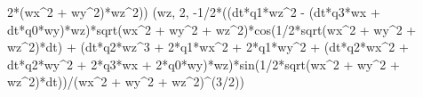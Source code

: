 \documentclass[]{article}
\newenvironment{Shaded}{}{}
\newcommand{\DecValTok}[1]{\textcolor[rgb]{0.25,0.63,0.44}{#1}}
\newcommand{\OperatorTok}[1]{\textcolor[rgb]{0.40,0.40,0.40}{#1}}
\newcommand{\NormalTok}[1]{#1}
\begin{document}
\begin{Shaded}
\begin{Highlighting}[]
\DecValTok{2}\OperatorTok{*}\NormalTok{(wx}\OperatorTok{^}\DecValTok{2} \OperatorTok{+}\NormalTok{ wy}\OperatorTok{^}\DecValTok{2}\NormalTok{)}\OperatorTok{*}\NormalTok{wz}\OperatorTok{^}\DecValTok{2}\NormalTok{))}
\NormalTok{(wz, }\DecValTok{2}\NormalTok{, }\OperatorTok{-}\DecValTok{1}\OperatorTok{/}\DecValTok{2}\OperatorTok{*}\NormalTok{((dt}\OperatorTok{*}\NormalTok{q1}\OperatorTok{*}\NormalTok{wz}\OperatorTok{^}\DecValTok{2} \OperatorTok{-}\NormalTok{ (dt}\OperatorTok{*}\NormalTok{q3}\OperatorTok{*}\NormalTok{wx }\OperatorTok{+}\NormalTok{ dt}\OperatorTok{*}\NormalTok{q0}\OperatorTok{*}\NormalTok{wy)}\OperatorTok{*}\NormalTok{wz)}\OperatorTok{*}\NormalTok{sqrt(wx}\OperatorTok{^}\DecValTok{2} \OperatorTok{+}\NormalTok{ wy}\OperatorTok{^}\DecValTok{2} \OperatorTok{+}\NormalTok{ wz}\OperatorTok{^}\DecValTok{2}\NormalTok{)}\OperatorTok{*}\NormalTok{cos(}\DecValTok{1}\OperatorTok{/}\DecValTok{2}\OperatorTok{*}\NormalTok{sqrt(wx}\OperatorTok{^}\DecValTok{2} \OperatorTok{+}\NormalTok{ wy}\OperatorTok{^}\DecValTok{2} \OperatorTok{+}\NormalTok{ wz}\OperatorTok{^}\DecValTok{2}\NormalTok{)}\OperatorTok{*}\NormalTok{dt) }\OperatorTok{+}\NormalTok{ (dt}\OperatorTok{*}\NormalTok{q2}\OperatorTok{*}\NormalTok{wz}\OperatorTok{^}\DecValTok{3} \OperatorTok{+} \DecValTok{2}\OperatorTok{*}\NormalTok{q1}\OperatorTok{*}\NormalTok{wx}\OperatorTok{^}\DecValTok{2} \OperatorTok{+} \DecValTok{2}\OperatorTok{*}\NormalTok{q1}\OperatorTok{*}\NormalTok{wy}\OperatorTok{^}\DecValTok{2} \OperatorTok{+}\NormalTok{ (dt}\OperatorTok{*}\NormalTok{q2}\OperatorTok{*}\NormalTok{wx}\OperatorTok{^}\DecValTok{2} \OperatorTok{+}\NormalTok{ dt}\OperatorTok{*}\NormalTok{q2}\OperatorTok{*}\NormalTok{wy}\OperatorTok{^}\DecValTok{2} \OperatorTok{+} \DecValTok{2}\OperatorTok{*}\NormalTok{q3}\OperatorTok{*}\NormalTok{wx }\OperatorTok{+} \DecValTok{2}\OperatorTok{*}\NormalTok{q0}\OperatorTok{*}\NormalTok{wy)}\OperatorTok{*}\NormalTok{wz)}\OperatorTok{*}\NormalTok{sin(}\DecValTok{1}\OperatorTok{/}\DecValTok{2}\OperatorTok{*}\NormalTok{sqrt(wx}\OperatorTok{^}\DecValTok{2} \OperatorTok{+}\NormalTok{ wy}\OperatorTok{^}\DecValTok{2} \OperatorTok{+}\NormalTok{ wz}\OperatorTok{^}\DecValTok{2}\NormalTok{)}\OperatorTok{*}\NormalTok{dt))}\OperatorTok{/}\NormalTok{(wx}\OperatorTok{^}\DecValTok{2} \OperatorTok{+}\NormalTok{ wy}\OperatorTok{^}\DecValTok{2} \OperatorTok{+}\NormalTok{ wz}\OperatorTok{^}\DecValTok{2}\NormalTok{)}\OperatorTok{^}\NormalTok{(}\DecValTok{3}\OperatorTok{/}\DecValTok{2}\NormalTok{))}

\end{Highlighting}
\end{Shaded}
\end{document}
